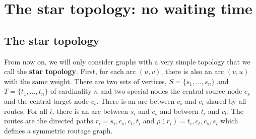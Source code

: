 \documentclass[a4paper,10pt]{article}
\begin{document}
\section{The star topology: no waiting time} \label{sec:PAZL}
  
   
    
    \subsection{The star topology}
    
      From now on, we will only consider graphs with a very simple topology that we call the {\bf star topology}. 
      First, for each arc $(u,v)$, there is also an arc $(v,u)$ with the same weight.
      There are two sets of vertices, $S=\{s_1,...,s_n\}$ and $T=\{t_1,...,t_n\}$ of cardinality $n$ and two special nodes
      the central source node {\bf $c_s$} and the central target node {\bf $c_t$}. There is an arc between {\bf $c_s$} and {\bf $c_t$} shared by all routes. For all $i$, there is an arc between $s_i$ and $c_s$ and between $t_i$ and $c_t$.
      The routes are the directed paths $r_i = s_i,c_s,c_t,t_i$ and $\rho(r_i) = t_i,c_t,c_s,s_i$ which defines a 
      symmetric routage graph. 
      
      
       \begin{center}
	 

  \end{center}
	
\end{document}
